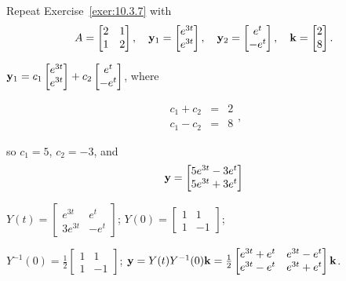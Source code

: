 \documentclass{ximera}
\begin{document}
\begin{problem}\label{exer:10.3.10}
 Repeat Exercise~\ref{exer:10.3.7} with
$$
 A=\begin{bmatrix} 2 &1\\ 1& 2\end{bmatrix}, \quad {\bf y}_1=\begin{bmatrix} e^{3t} \\
e^{3t}
\end{bmatrix}, \quad {\bf y}_2=\begin{bmatrix}e^t \\
-e^t\end{bmatrix}, \quad {\bf k}=\begin{bmatrix} 2 \\ 8
\end{bmatrix}.$$

\begin{solution}
    ${\bf y}_1=c_1\begin{bmatrix} e^{3t} \\e^{3t}
\end{bmatrix}+c_2\begin{bmatrix}e^t \\
-e^t\end{bmatrix}$,
where

$$\begin{array}{rcl}
c_1+c_2&=&2\\c_1-c_2&=&8
\end{array},
$$

 so $c_1=5$, $c_2=-3$, and
$${\bf y}=\begin{bmatrix}5e^{3t}-3e^t\\5e^{3t}+3e^t
\end{bmatrix}$$

$Y(t)=\begin{bmatrix}e^{3t}&e^t\\
3e^{3t}&-e^t\end{bmatrix}$;
$Y(0)=\begin{bmatrix}1&1\\1&-1\end{bmatrix}$;

$Y^{-1}(0)=
\frac{1}{2}\begin{bmatrix}1&1\\1&-1\end{bmatrix}$;
${\bf y}=Y(t)Y^{-1}(0){\bf k}=
\frac{1}{2}\begin{bmatrix}e^{3t}+e^t&e^{3t}-e^t
\\e^{3t}-e^t&e^{3t}+e^t\end{bmatrix}{\bf k}$.
\end{solution}
\end{problem}
\end{document}
